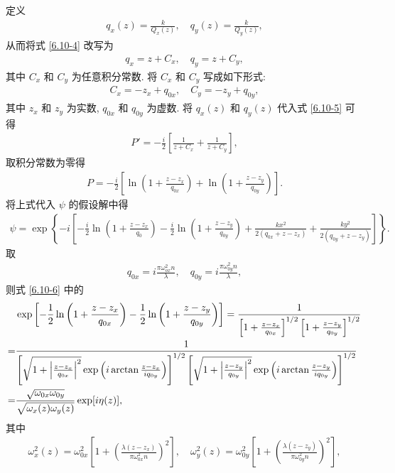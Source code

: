 \documentclass{note}
\begin{document}
\begin{pf}
    定义
    \begin{align}
        q_x(z)=\frac{k}{Q_x(z)},\quad q_y(z)=\frac{k}{Q_y(z)},
    \end{align}
    从而将式 \eqref{6.10-4} 改写为
    \begin{align}
        q_x=z+C_x,\quad q_y=z+C_y,
    \end{align}
    其中 $C_x$ 和 $C_y$ 为任意积分常数.
    将 $C_x$ 和 $C_y$ 写成如下形式:
    \begin{align}
        C_x=-z_x+q_{0x},\quad C_y=-z_y+q_{0y},
    \end{align}
    其中 $z_x$ 和 $z_y$ 为实数, $q_{0x}$ 和 $q_{0y}$ 为虚数.
    将 $q_x(z)$ 和 $q_y(z)$ 代入式 \eqref{6.10-5} 可得
    \begin{align}
        P'=-\frac{i}{2}\left[\frac{1}{z+C_x}+\frac{1}{z+C_y}\right],
    \end{align}
    取积分常数为零得
    \begin{align}
        P=-\frac{i}{2}\left[\ln\left(1+\frac{z-z_x}{q_{0x}}\right)+\ln\left(1+\frac{z-z_y}{q_{0y}}\right)\right].
    \end{align}
    将上式代入 $\psi$ 的假设解中得
    \begin{align}
        \label{6.10-6}
        \psi=\exp\left\{-i\left[-\frac{i}{2}\ln\left(1+\frac{z-z_x}{q_0}\right)-\frac{i}{2}\ln\left(1+\frac{z-z_y}{q_{0y}}\right)+\frac{kx^2}{2(q_{0x}+z-z_x)}+\frac{ky^2}{2(q_{0y}+z-z_y)}\right]\right\}.
    \end{align}
    取
    \begin{gather}
        q_{0x}=i\frac{\pi\omega_{ox}^2n}{\lambda},\quad q_{0y}=i\frac{\pi\omega_{0y}^2n}{\lambda},
    \end{gather}
    则式 \eqref{6.10-6} 中的
    \begin{align}
        \notag&\exp\left[-\frac{1}{2}\ln\left(1+\frac{z-z_x}{q_{0x}}\right)-\frac{1}{2}\ln\left(1+\frac{z-z_y}{q_{0y}}\right)\right]=\frac{1}{\left[1+\frac{z-z_x}{q_{0x}}\right]^{1/2}\left[1+\frac{z-z_y}{q_{0y}}\right]^{1/2}}\\
        \notag=&\frac{1}{\left[\sqrt{1+\left\lvert\frac{z-z_x}{q_{0x}}\right\rvert^2}\exp\left(i\arctan\frac{z-z_x}{iq_{0y}}\right)\right]^{1/2}\left[\sqrt{1+\left\lvert\frac{z-z_y}{q_{0y}}\right\rvert^2}\exp\left(i\arctan\frac{z-z_y}{iq_{0y}}\right)\right]^{1/2}}\\
        =&\frac{\sqrt{\omega_{0x}\omega_{0y}}}{\sqrt{\omega_x(z)\omega_y(z)}}\exp[i\eta(z)],
    \end{align}
    其中
    \begin{gather}
        \omega_x^2(z)=\omega_{0x}^2\left[1+\left(\frac{\lambda(z-z_x)}{\pi\omega_{0x}^2n}\right)^2\right],\quad\omega_y^2(z)=\omega_{0y}^2\left[1+\left(\frac{\lambda(z-z_y)}{\pi\omega_{0y}^2n}\right)^2\right],\\

\end{gather}
\end{pf}
\end{document}
